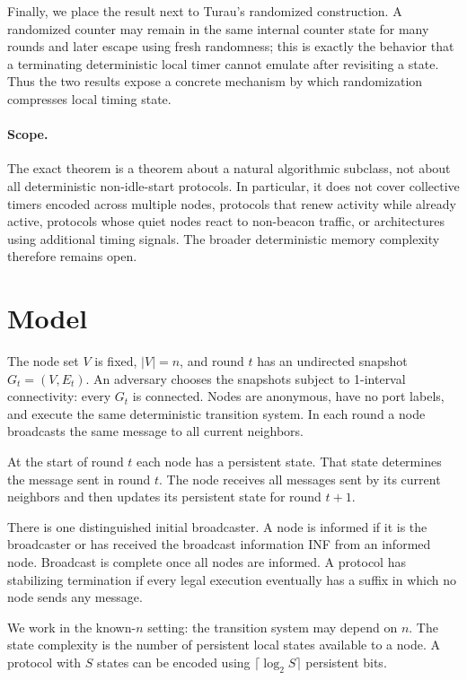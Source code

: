 \documentclass[11pt]{article}
\begin{document}
Finally, we place the result next to Turau's randomized construction. A randomized counter may remain in the same internal counter state for many rounds and later escape using fresh randomness; this is exactly the behavior that a terminating deterministic local timer cannot emulate after revisiting a state. Thus the two results expose a concrete mechanism by which randomization compresses local timing state.

\paragraph{Scope.} The exact theorem is a theorem about a natural algorithmic subclass, not about all deterministic non-idle-start protocols. In particular, it does not cover collective timers encoded across multiple nodes, protocols that renew activity while already active, protocols whose quiet nodes react to non-beacon traffic, or architectures using additional timing signals. The broader deterministic memory complexity therefore remains open.

\section{Model}
The node set $V$ is fixed, $|V|=n$, and round $t$ has an undirected snapshot $G_t=(V,E_t)$. An adversary chooses the snapshots subject to 1-interval connectivity: every $G_t$ is connected. Nodes are anonymous, have no port labels, and execute the same deterministic transition system. In each round a node broadcasts the same message to all current neighbors.

At the start of round $t$ each node has a persistent state. That state determines the message sent in round $t$. The node receives all messages sent by its current neighbors and then updates its persistent state for round $t+1$.

There is one distinguished initial broadcaster. A node is informed if it is the broadcaster or has received the broadcast information INF from an informed node. Broadcast is complete once all nodes are informed. A protocol has stabilizing termination if every legal execution eventually has a suffix in which no node sends any message.

We work in the known-$n$ setting: the transition system may depend on $n$. The state complexity is the number of persistent local states available to a node. A protocol with $S$ states can be encoded using $\lceil\log_2 S\rceil$ persistent bits.
\end{document}
